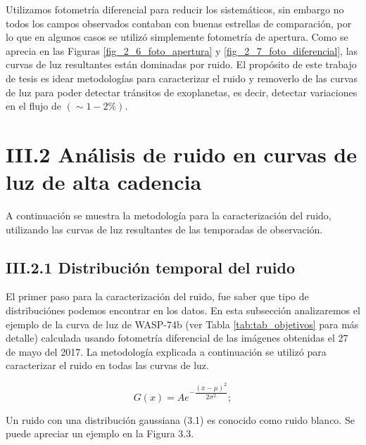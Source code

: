 Utilizamos fotometría diferencial para reducir los sistemáticos, sin embargo no todos los campos observados contaban con buenas estrellas de comparación, por lo que en algunos casos se utilizó simplemente fotometría de apertura. Como se aprecia en las Figuras \ref{fig_2_6_foto_apertura} y \ref{fig_2_7_foto_diferencial}, las curvas de luz resultantes están dominadas por ruido. El propósito de este trabajo de tesis es idear metodologías para caracterizar el ruido y removerlo de las curvas de luz para poder detectar tránsitos de exoplanetas, es decir, detectar variaciones en el flujo de $(\sim 1-2 \%)$.

\section*{III.2 Análisis de ruido en curvas de luz de alta cadencia}

A continuación se muestra la metodología para la caracterización del ruido, utilizando las curvas de luz resultantes de las temporadas de observación.

\subsection*{III.2.1 Distribución temporal del ruido}

El primer paso para la caracterización del ruido, fue saber que tipo de distribuciónes podemos encontrar en los datos. En esta subsección analizaremos el ejemplo de la curva de luz de WASP-74b (ver Tabla \ref{tab:tab_objetivos} para más detalle) calculada usando fotometría diferencial de las imágenes obtenidas el 27 de mayo del 2017. La metodología explicada a continuación se utiliz\'o para caracterizar el ruido en todas las curvas de luz.

\begin{equation}
  \displaystyle G(x)=Ae^{-\dfrac{(x-\mu)^{2}}{2\sigma^{2}}};
\end{equation}

Un ruido con una distribución gaussiana (3.1) es conocido como ruido blanco. Se puede apreciar un ejemplo en la Figura 3.3.

